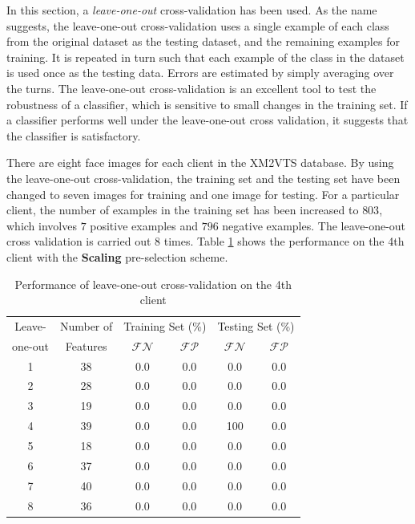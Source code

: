 In this section, a \textit{leave-one-out} cross-validation has been used. As the name suggests, the leave-one-out cross-validation uses a single example of each class from the original dataset as the testing dataset, and the remaining examples for training. It is repeated in turn such that each example of the class in the dataset is used once as the testing data. Errors are estimated by simply averaging over the turns. The leave-one-out cross-validation is an excellent tool to test the robustness of a classifier, which is sensitive to small changes in the training set. If a classifier performs well under the leave-one-out cross validation, it suggests that the classifier is satisfactory.

There are eight face images for each client in the \mbox{XM2VTS} database. By using the leave-one-out cross-validation, the training set and the testing set have been changed to seven images for training and one image for testing. For a particular client, the number of examples in the training set has been increased to $803$, which involves $7$ positive examples and $796$ negative examples. The leave-one-out cross validation is carried out $8$ times. \mbox{Table} \ref{tab:cross-validation} shows the performance on the 4th client with the \textbf{Scaling} pre-selection scheme.
\begin{table}[ht]
\caption{Performance of leave-one-out cross-validation on the 4th client}
\begin{center}
 \begin{tabular}{|c||c|c|c|c|c|}
  \hline
   Leave- & Number of & \multicolumn{2}{c|}{Training Set (\%)} & \multicolumn{2}{c|}{Testing Set (\%)}\\
   \cline{3-6}
  one-out & Features & $\mathcal{FN}$ & $\mathcal{FP}$ & $\mathcal{FN}$ & $\mathcal{FP}$ \\
  \hline
  1 & 38 & 0.0 & 0.0 & 0.0 & 0.0\\
  2 & 28 & 0.0 & 0.0 & 0.0 & 0.0\\
  3 & 19 & 0.0 & 0.0 & 0.0 & 0.0\\
  4 & 39 & 0.0 & 0.0 & 100 & 0.0\\
  5 & 18 & 0.0 & 0.0 & 0.0 & 0.0\\
  6 & 37 & 0.0 & 0.0 & 0.0 & 0.0\\
  7 & 40 & 0.0 & 0.0 & 0.0 & 0.0\\
  8 & 36 & 0.0 & 0.0 & 0.0 & 0.0\\
  \hline
 \end{tabular}
\end{center}
\label{tab:cross-validation}
\end{table} 
